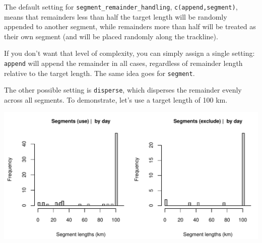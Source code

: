 \documentclass[
]{book}
\newenvironment{Shaded}{\begin{snugshade}}{\end{snugshade}}
\newcommand{\AttributeTok}[1]{\textcolor[rgb]{0.13,0.29,0.53}{#1}}
\newcommand{\CommentTok}[1]{\textcolor[rgb]{0.56,0.35,0.01}{\textit{#1}}}
\newcommand{\ConstantTok}[1]{\textcolor[rgb]{0.56,0.35,0.01}{#1}}
\newcommand{\DecValTok}[1]{\textcolor[rgb]{0.00,0.00,0.81}{#1}}
\newcommand{\FunctionTok}[1]{\textcolor[rgb]{0.13,0.29,0.53}{\textbf{#1}}}
\newcommand{\NormalTok}[1]{#1}
\newcommand{\OtherTok}[1]{\textcolor[rgb]{0.56,0.35,0.01}{#1}}
\newcommand{\SpecialCharTok}[1]{\textcolor[rgb]{0.81,0.36,0.00}{\textbf{#1}}}
\newcommand{\StringTok}[1]{\textcolor[rgb]{0.31,0.60,0.02}{#1}}
\begin{document}
The default setting for \texttt{segment\_remainder\_handling}, \texttt{c(\textquotesingle{}append\textquotesingle{},\textquotesingle{}segment\textquotesingle{})}, means that remainders less than half the target length will be randomly appended to another segment, while remainders more than half will be treated as their own segment (and will be placed randomly along the trackline).

If you don't want that level of complexity, you can simply assign a single setting: \texttt{\textquotesingle{}append\textquotesingle{}} will append the remainder in all cases, regardless of remainder length relative to the target length. The same idea goes for \texttt{\textquotesingle{}segment\textquotesingle{}}.

The other possible setting is \texttt{\textquotesingle{}disperse\textquotesingle{}}, which disperses the remainder evenly across all segments. To demonstrate, let's use a target length of 100 km.

\begin{Shaded}
\end{Shaded}

\includegraphics{figures/unnamed-chunk-403-1.pdf}
\end{document}
